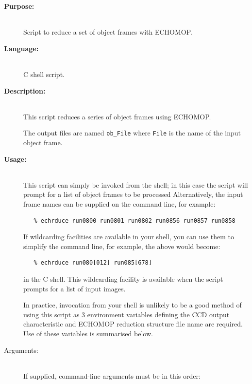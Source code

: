 \documentclass[twoside,11pt]{article}
\newcommand{\xref}[3]{#1}
\begin{document}
\begin{description}

\item [{\bf Purpose:}] \mbox{} \\
     Script to reduce a set of object frames with \xref{ECHOMOP}{sun152}{}.

\item [{\bf Language:}] \mbox{} \\
     C shell script.

\item [{\bf Description:}] \mbox{} \\
     This script reduces a series of object frames using ECHOMOP.

     The output files are named \verb+ob_File+ where \verb+File+ is the
     name of the input object frame.

\item [{\bf Usage:}] \mbox{} \\
     This script can simply be invoked from the shell; in this case
     the script will prompt for a list of object frames to be processed
     Alternatively, the input frame names can be supplied on the
     command line, for example:

\begin{verbatim}
   % echrduce run0800 run0801 run0802 run0856 run0857 run0858
\end{verbatim}

     If wildcarding facilities are available in your shell, you can use
     them to simplify the command line, for example, the above would
     become:

\begin{verbatim}
   % echrduce run080[012] run085[678]
\end{verbatim}

     in the C shell.  This wildcarding facility is available when the
     script prompts for a list of input images.

     In practice, invocation from your shell is unlikely to be a good
     method of using this script as 3 environment variables defining
     the CCD output characteristic and ECHOMOP reduction structure file
     name are required.  Use of these variables is summarised below.

\item [Arguments:] \mbox{} \\
     If supplied, command-line arguments must be in this order:

\begin{enumerate}


\end{enumerate}
\end{description}
\end{document}
